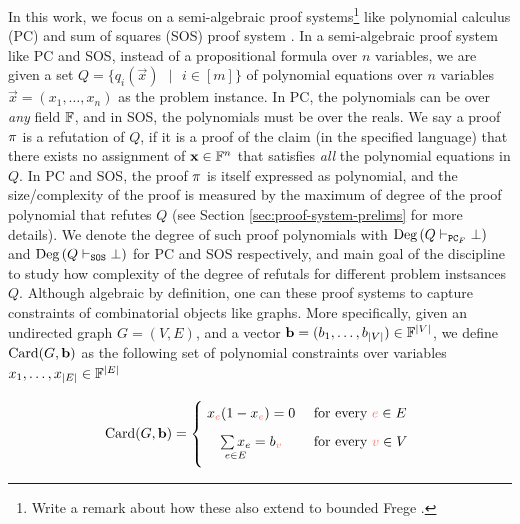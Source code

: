 \documentclass[11pt]{article}
\begin{document}
In this work, we focus on a semi-algebraic proof systems\footnote{Write a remark about how these also extend to bounded Frege .} like polynomial calculus (PC) \citep{alekhnovich2004pseudorandom} and sum of squares (SOS) proof system \citep{parrilo2000structured, boazCourse}.
In a semi-algebraic proof system like PC and SOS, instead of a propositional formula over $n$ variables, we are given a set $Q=\{q_i(\vec{x}) \text{ } |\text{ } i \in [m] \}$ of polynomial equations over $n$ variables $\vec{x} = (x_1, \dots, x_n)$ as the problem instance.
In PC, the polynomials can be over \emph{any} field $\mathbb{F}$, and in SOS, the polynomials must be over the reals.
We say a proof $\pi$ is a refutation of $Q$, if it is a proof of the claim (in the specified language) that there exists no assignment of $\mathbf{x} \in \mathbb{F}^n$ that satisfies \emph{all} the polynomial equations in $Q$. 
In PC and SOS, the proof $\pi$ is itself expressed as polynomial, and 
the size/complexity of the proof is measured by the maximum of degree of the proof polynomial that refutes $Q$ (see Section \ref{sec:proof-system-prelims} for more details).
We denote the degree of such proof polynomials with $\text{Deg}\left(Q \vdash_{\texttt{PC}_F} \bot\right)$ and $\text{Deg}\left(Q \vdash_{\texttt{SOS}} \bot\right)$ for PC and SOS respectively, and  main goal of the discipline to study how complexity of the degree of refutals for different problem instsances $Q$.
Although algebraic by definition, one can these proof systems to capture constraints of combinatorial objects like graphs.
More specifically, given an undirected graph $G=(V,E)$, and a vector $\mathbf{b} = (b_1, \dots, b_{|V|})  \in \mathbb{F}^{\left|V\right|}$, we define $\text{Card}(G, \mathbf{b})$ as the following set of polynomial constraints over variables $x_1, \dots, x_{|E|} \in \mathbb{F}^{\left|E\right|}$

\[
        \Card{G, \vec{b}}=
        \Bigger[10]\{\begin{array}{@{}cl}
                x_{\highlight{e}}(1 - x_{\highlight{e}}) = 0 & \text{ for every $\highlight{e} \in E$}\\[3mm]
                \underset{e \in E}{\sum x_e}= b_{\highlight{v}} & \text{ for every $\highlight{v} \in V$} \\[3mm]
        \end{array}
\]
\end{document}

